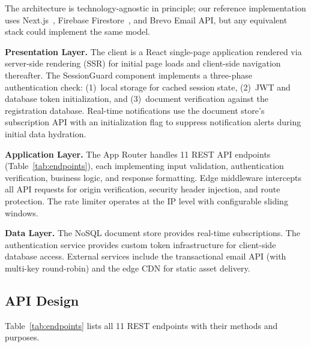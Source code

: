 \documentclass[11pt,a4paper]{article}
\theoremstyle{plain}
\theoremstyle{definition}
\begin{document}
The architecture is technology-agnostic in principle; our reference implementation uses Next.js~\cite{nextjs}, Firebase Firestore~\cite{firebase}, and Brevo Email API, but any equivalent stack could implement the same model.

\textbf{Presentation Layer.} The client is a React single-page application rendered via server-side rendering (SSR) for initial page loads and client-side navigation thereafter. The SessionGuard component implements a three-phase authentication check: (1)~local storage for cached session state, (2)~JWT and database token initialization, and (3)~document verification against the registration database. Real-time notifications use the document store's subscription API with an initialization flag to suppress notification alerts during initial data hydration.

\textbf{Application Layer.} The App Router handles 11 REST API endpoints (Table~\ref{tab:endpoints}), each implementing input validation, authentication verification, business logic, and response formatting. Edge middleware intercepts all API requests for origin verification, security header injection, and route protection. The rate limiter operates at the IP level with configurable sliding windows.

\textbf{Data Layer.} The NoSQL document store provides real-time subscriptions. The authentication service provides custom token infrastructure for client-side database access. External services include the transactional email API (with multi-key round-robin) and the edge CDN for static asset delivery.

\subsection{API Design}

Table~\ref{tab:endpoints} lists all 11 REST endpoints with their methods and purposes.
\end{document}
